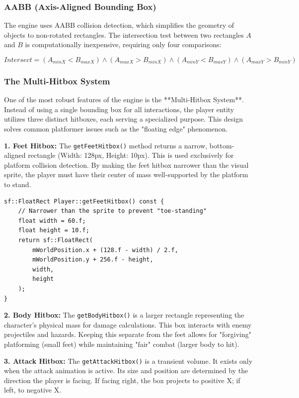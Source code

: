 \documentclass[10pt, a4paper]{article}
\begin{document}
\subsubsection{AABB (Axis-Aligned Bounding Box)}
The engine uses AABB collision detection, which simplifies the geometry of objects to non-rotated rectangles. The intersection test between two rectangles $A$ and $B$ is computationally inexpensive, requiring only four comparisons:

\begin{equation}
Intersect = (A_{minX} < B_{maxX}) \land (A_{maxX} > B_{minX}) \land (A_{minY} < B_{maxY}) \land (A_{maxY} > B_{minY})
\end{equation}

\subsubsection{The Multi-Hitbox System}
One of the most robust features of the engine is the **Multi-Hitbox System**. Instead of using a single bounding box for all interactions, the player entity utilizes three distinct hitboxes, each serving a specialized purpose. This design solves common platformer issues such as the "floating edge" phenomenon.

\textbf{1. Feet Hitbox:}
The \texttt{getFeetHitbox()} method returns a narrow, bottom-aligned rectangle (Width: 128px, Height: 10px). This is used exclusively for platform collision detection. By making the feet hitbox narrower than the visual sprite, the player must have their center of mass well-supported by the platform to stand.
\begin{lstlisting}[caption={Feet Hitbox Calculation}]
sf::FloatRect Player::getFeetHitbox() const {
    // Narrower than the sprite to prevent "toe-standing"
    float width = 60.f; 
    float height = 10.f;
    return sf::FloatRect(
        mWorldPosition.x + (128.f - width) / 2.f, 
        mWorldPosition.y + 256.f - height, 
        width, 
        height
    );
}
\end{lstlisting}

\textbf{2. Body Hitbox:}
The \texttt{getBodyHitbox()} is a larger rectangle representing the character's physical mass for damage calculations. This box interacts with enemy projectiles and hazards. Keeping this separate from the feet allows for "forgiving" platforming (small feet) while maintaining "fair" combat (larger body to hit).

\textbf{3. Attack Hitbox:}
The \texttt{getAttackHitbox()} is a transient volume. It exists only when the attack animation is active. Its size and position are determined by the direction the player is facing. If facing right, the box projects to positive X; if left, to negative X.
\end{document}
